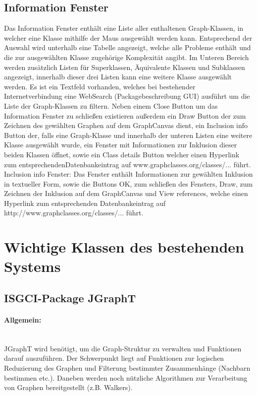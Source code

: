 \documentclass[10pt,a4paper]{article}
\begin{document}
\subsection{Information Fenster}
Das Information Fenster enthält eine Liste aller enthaltenen Graph-Klassen, in welcher eine Klasse mithilfe der Maus ausgewählt werden kann. Entsprechend der Auswahl wird unterhalb eine Tabelle angezeigt, welche alle Probleme enthält und die zur ausgewählten Klasse zugehörige Komplexität angibt. Im Unteren Bereich werden zusätzlich Listen für Superklassen, Äquivalente Klassen und Subklassen angezeigt, innerhalb dieser drei Listen kann eine weitere Klasse ausgewählt werden. Es ist ein Textfeld vorhanden, welches bei bestehender Internetverbindung eine WebSearch (Packagebeschreibung GUI) ausführt um die Liste der Graph-Klassen zu filtern. Neben einem Close Button um das Information Fenster zu schließen existieren außerdem ein Draw Button der zum Zeichnen des gewählten Graphen auf dem GraphCanvas dient, ein Inclusion info Button der, falls eine Graph-Klasse und innerhalb der unteren Listen eine weitere Klasse ausgewählt wurde, ein Fenster mit Informationen zur Inklusion dieser beiden Klassen öffnet, sowie ein Class details Button welcher einen Hyperlink zum entsprechendenDatenbankeintrag auf www.graphclasses.org/classes/... führt.\\
Inclusion info Fenster: Das Fenster enthält Informationen zur gewählten Inklusion in textueller Form, sowie die Buttons OK, zum schließen des Fensters, Draw, zum Zeichnen der Inklusion auf dem GraphCanvas und View references, welche einen Hyperlink zum entsprechenden Datenbankeintrag auf http://www.graphclasses.org/classes/... führt.

\section{Wichtige Klassen des bestehenden Systems}
\subsection{ISGCI-Package JGraphT}

\paragraph{Allgemein:}\ \\
JGraphT wird benötigt, um die Graph-Struktur zu verwalten und Funktionen darauf auszuführen. Der Schwerpunkt liegt auf Funktionen zur logischen Reduzierung des Graphen und Filterung bestimmter Zusammenhänge (Nachbarn bestimmen etc.). Daneben werden noch nützliche Algorithmen zur Verarbeitung von Graphen bereitgestellt (z.B. Walkers).\\
\end{document}
